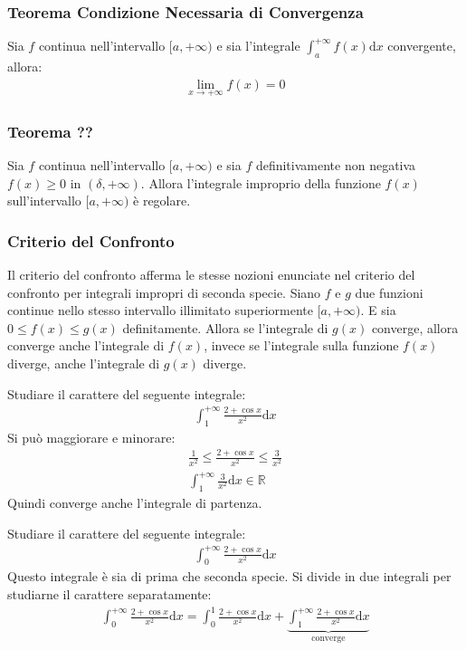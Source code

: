 \documentclass{article}
\newcommand{\df}{\mathrm{d}}
\numberwithin{equation}{subsection}
\begin{document}
\subsubsection{Teorema Condizione Necessaria di Convergenza}

Sia $f$ continua nell'intervallo $[a,+\infty)$ e sia l'integrale $\int_a^{+\infty}f(x)\df x$ convergente, allora:
\begin{gather*}
    \lim_{x\to+\infty}f(x)=0
\end{gather*}

\subsubsection{Teorema ??}

Sia $f$ continua nell'intervallo $[a,+\infty)$ e sia $f$ definitivamente non negativa $f(x)\geq0$ in $(\delta, +\infty)$.
Allora l'integrale improprio della funzione $f(x)$ sull'intervallo $[a,+\infty)$ è regolare. 

\subsubsection{Criterio del Confronto}

Il criterio del confronto afferma le stesse nozioni enunciate nel criterio del confronto per integrali impropri di seconda specie. 
Siano $f$ e $g$ due funzioni continue nello stesso intervallo illimitato superiormente $[a,+\infty)$. E sia $0\leq f(x)\leq g(x)$ definitamente. 
Allora se l'integrale di $g(x)$ converge, allora converge anche l'integrale di $f(x)$, invece se l'integrale sulla funzione $f(x)$ diverge, anche l'integrale di $g(x)$ diverge. 



Studiare il carattere del seguente integrale:
\begin{gather*}
    \displaystyle\int_1^{+\infty}\frac{2+\cos x}{x^2}\df x
\end{gather*}
Si può maggiorare e minorare:
\begin{gather*}
    \displaystyle\frac{1}{x^2}\leq\frac{2+\cos x}{x^2}\leq\frac{3}{x^2}\\
    \displaystyle\int_1^{+\infty}\frac{3}{x^2}\df x\in\mathbb{R}
\end{gather*}
Quindi converge anche l'integrale di partenza. 


Studiare il carattere del seguente integrale:
\begin{gather*}
    \displaystyle\int_0^{+\infty}\frac{2+\cos x}{x^2}\df x
\end{gather*}
Questo integrale è sia di prima che seconda specie. Si divide in due integrali per studiarne il carattere separatamente:
\begin{gather*}
    \displaystyle\int_0^{+\infty}\frac{2+\cos x}{x^2}\df x=
    \int_0^{1}\frac{2+\cos x}{x^2}\df x+
    \underbrace{\int_1^{+\infty}\frac{2+\cos x}{x^2}\df x}_{\mbox{converge}}
\end{gather*}
\end{document}

